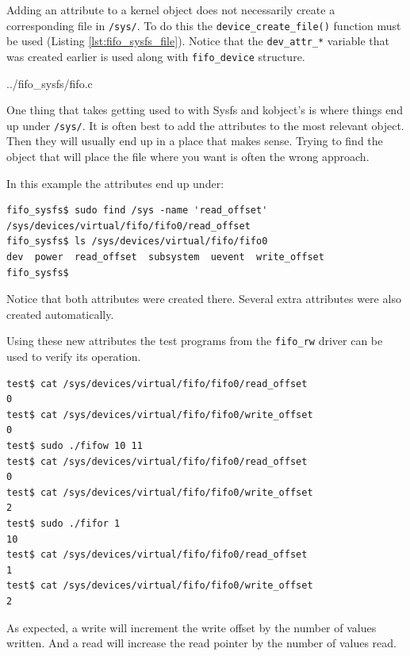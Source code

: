 \documentclass{article}
\begin{document}
Adding an attribute to a kernel object does not necessarily create
a corresponding file in \verb+/sys/+.
To do this the \verb+device_create_file()+ function must be used
(Listing \ref{lst:fifo_sysfs_file}).
Notice that the \verb+dev_attr_*+ variable that was created earlier
is used along with \verb+fifo_device+ structure.


	{../fifo_sysfs/fifo.c}

One thing that takes getting used to with Sysfs and kobject's is where
things end up under \verb+/sys/+.
It is often best to add the attributes to the most relevant object.
Then they will usually end up in a place that makes sense.
Trying to find the object that will place the file where you want
is often the wrong approach.

In this example the attributes end up under:

\begin{verbatim}
fifo_sysfs$ sudo find /sys -name 'read_offset'
/sys/devices/virtual/fifo/fifo0/read_offset
fifo_sysfs$ ls /sys/devices/virtual/fifo/fifo0
dev  power  read_offset  subsystem  uevent  write_offset
fifo_sysfs$ 
\end{verbatim}

Notice that both attributes were created there.
Several extra attributes were also created automatically.

\begin{samepage}
Using these new attributes the test programs from the \verb+fifo_rw+
driver can be used to verify its operation.

\begin{verbatim}
test$ cat /sys/devices/virtual/fifo/fifo0/read_offset 
0
test$ cat /sys/devices/virtual/fifo/fifo0/write_offset 
0
test$ sudo ./fifow 10 11
test$ cat /sys/devices/virtual/fifo/fifo0/read_offset 
0
test$ cat /sys/devices/virtual/fifo/fifo0/write_offset 
2
test$ sudo ./fifor 1
10
test$ cat /sys/devices/virtual/fifo/fifo0/read_offset 
1
test$ cat /sys/devices/virtual/fifo/fifo0/write_offset 
2
\end{verbatim}
\end{samepage}

As expected, a write will increment the write offset by
the number of values written.
And a read will increase the read pointer by the number
of values read.

\end{document}
